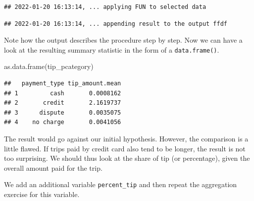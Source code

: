 \documentclass[
  12pt,
]{style/krantz}
\newenvironment{Shaded}{\begin{snugshade}}{\end{snugshade}}
\newcommand{\AttributeTok}[1]{\textcolor[rgb]{0.77,0.63,0.00}{#1}}
\newcommand{\CommentTok}[1]{\textcolor[rgb]{0.56,0.35,0.01}{\textit{#1}}}
\newcommand{\ConstantTok}[1]{\textcolor[rgb]{0.00,0.00,0.00}{#1}}
\newcommand{\ControlFlowTok}[1]{\textcolor[rgb]{0.13,0.29,0.53}{\textbf{#1}}}
\newcommand{\DecValTok}[1]{\textcolor[rgb]{0.00,0.00,0.81}{#1}}
\newcommand{\FunctionTok}[1]{\textcolor[rgb]{0.00,0.00,0.00}{#1}}
\newcommand{\NormalTok}[1]{#1}
\newcommand{\OtherTok}[1]{\textcolor[rgb]{0.56,0.35,0.01}{#1}}
\newcommand{\SpecialCharTok}[1]{\textcolor[rgb]{0.00,0.00,0.00}{#1}}
\begin{document}
\begin{verbatim}
## 2022-01-20 16:13:14, ... applying FUN to selected data
\end{verbatim}

\begin{verbatim}
## 2022-01-20 16:13:14, ... appending result to the output ffdf
\end{verbatim}

Note how the output describes the procedure step by step. Now we can have a look at the resulting summary statistic in the form of a \texttt{data.frame()}.

\begin{Shaded}
\begin{Highlighting}[]
\FunctionTok{as.data.frame}\NormalTok{(tip\_pcategory)}
\end{Highlighting}
\end{Shaded}

\begin{verbatim}
##   payment_type tip_amount.mean
## 1         cash       0.0008162
## 2       credit       2.1619737
## 3      dispute       0.0035075
## 4    no charge       0.0041056
\end{verbatim}

The result would go against our initial hypothesis. However, the comparison is a little flawed. If trips paid by credit card also tend to be longer, the result is not too surprising. We should thus look at the share of tip (or percentage), given the overall amount paid for the trip.

We add an additional variable \texttt{percent\_tip} and then repeat the aggregation exercise for this variable.

\begin{Shaded}
\end{Shaded}
\end{document}
